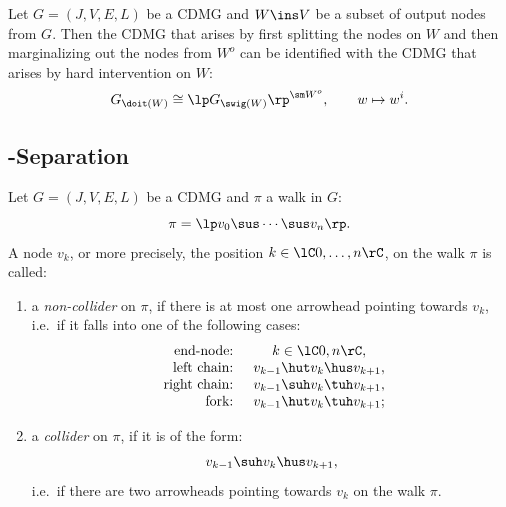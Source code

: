 \begin{Lem}
     Let $G=(J,V,E,L)$ be a CDMG and $W \ins V$ be a subset of output nodes from $G$.
     Then the CDMG that arises by first splitting the nodes on $W$ 
      and then marginalizing out the nodes from $W^o$ 
     can be identified with the CDMG that arises by hard intervention on $W$:
     \[ G_{\doit(W)} \cong \lp G_{\swig(W)}\rp^{\sm W^o}, \qquad w \mapsto w^i. \]
\end{Lem}

\subsection{\textsigma-Separation}

\begin{Def}
  Let $G=(J,V,E,L)$ be a CDMG and $\pi$ a walk in $G$:
  \[ \pi =\lp  v_0 \sus \cdots \sus v_n \rp.  \]
  A node $v_k$, or more precisely, the position $k \in \lC 0,\dots, n \rC$,
  on the walk $\pi$ is called:
     \begin{enumerate}
     \item a \emph{non-collider} on $\pi$, if there is at most one arrowhead pointing towards $v_k$, i.e.\ if it falls into one of the following cases:
  \[\begin{array}{rccl}
    \text{ end-node: } & k \in \lC 0,n \rC, \\
    \text{ left chain: } & v_{k-1} \hut v_k \hus v_{k+1}, \\
    \text{ right chain: } & v_{k-1} \suh v_k \tuh v_{k+1},\\
    \text{ fork: } & v_{k-1} \hut v_k \tuh v_{k+1};
    \end{array}\]
  \item a \emph{collider} on $\pi$, if it is of the form: 
             \[v_{k-1} \suh v_k \hus v_{k+1},\] 
             i.e.\ if there are two arrowheads pointing towards $v_k$ on the walk $\pi$.
     \end{enumerate}
\end{Def}


